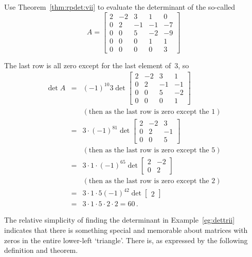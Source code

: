\begin{example} \label{eg:dettrii}
Use Theorem~\ref{thm:rpdet:vii} to evaluate the determinant of the  so-called   
\begin{equation*}
A=\begin{bmatrix}2&-2&3&1&0
\\0&2&-1&-1&-7
\\0&0&5&-2&-9
\\0&0&0&1&1
\\0&0&0&0&3 \end{bmatrix}
\end{equation*}
\begin{solution} 
The last row is all zero except for the last element of~\(3\), so
\begin{eqnarray*}
\det A&=&(-1)^{10}3\det\begin{bmatrix}2&-2&3&1
\\0&2&-1&-1
\\0&0&5&-2
\\0&0&0&1\end{bmatrix}
\\&&(\text{then as the last row is zero except the~\(1\)})
\\&=&3\cdot (-1)^81\det\begin{bmatrix}2&-2&3
\\0&2&-1
\\0&0&5\end{bmatrix}
\\&&(\text{then as the last row is zero except the~\(5\)})
\\&=&3\cdot1\cdot(-1)^65\det\begin{bmatrix}2&-2
\\0&2\end{bmatrix}
\\&&(\text{then as the last row is zero except the~\(2\)})
\\&=&3\cdot1\cdot5(-1)^42\det\begin{bmatrix}2\end{bmatrix}
\\&=&3\cdot1\cdot5\cdot2\cdot2=60\,.
\end{eqnarray*}
\end{solution}
\end{example}


The relative simplicity of finding the determinant in Example~\ref{eg:dettrii} indicates that there is something special and memorable about matrices with zeros in the entire lower-left `triangle'.
There is, as expressed by the following definition and theorem.






